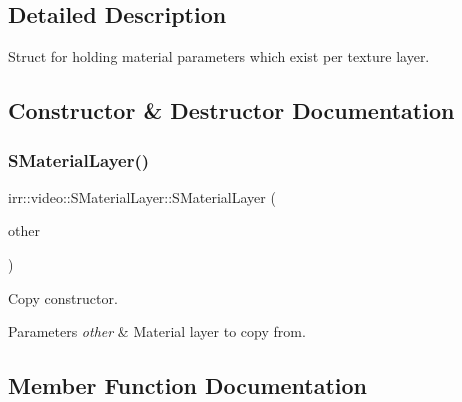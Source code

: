 \subsection{Detailed Description}
Struct for holding material parameters which exist per texture layer. 

\subsection{Constructor \& Destructor Documentation}
\mbox{\label{classirr_1_1video_1_1SMaterialLayer_afb8b8d94178e389f8afa1e6190a35f9d}} 
\subsubsection{\texorpdfstring{S\+Material\+Layer()}{SMaterialLayer()}}
{\footnotesize\ttfamily irr\+::video\+::\+S\+Material\+Layer\+::\+S\+Material\+Layer (\begin{DoxyParamCaption}\item[{const \hyperlink{classirr_1_1video_1_1SMaterialLayer}{S\+Material\+Layer} \&}]{other }\end{DoxyParamCaption})\hspace{0.3cm}{\ttfamily [inline]}}



Copy constructor. 


\begin{DoxyParams}{Parameters}
{\em other} & Material layer to copy from. \\
\hline
\end{DoxyParams}


\subsection{Member Function Documentation}
\mbox{\label{classirr_1_1video_1_1SMaterialLayer_aa8d7c025f5bb282537b8886c340dbe63}} 
